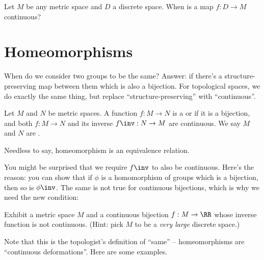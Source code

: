 \begin{ques}
	Let $M$ be any metric space and $D$ a discrete space.
	When is a map $f : D \to M$ continuous?
\end{ques}



\section{Homeomorphisms}
When do we consider two groups to be the same?
Answer: if there's a structure-preserving map between them which is also a bijection.
For topological spaces, we do exactly the same thing, but replace ``structure-preserving'' with ``continuous''.

\begin{definition}
	Let $M$ and $N$ be metric spaces.
	A function $f : M \to N$ is a
	 or  if it is a bijection,
	and both $f : M \to N$ and its inverse $f\inv : N \to M$ are continuous.
	We say $M$ and $N$ are .
\end{definition}
Needless to say, homeomorphism is an equivalence relation.

You might be surprised that we require $f\inv$ to also be continuous.
Here's the reason: you can show that if $\phi$ is a homomorphism of groups
which is a bijection, then so is $\phi\inv$.
The same is not true for continuous bijections, which is why we need the new condition:
\begin{exercise}
	Exhibit a metric space $M$ and a continuous bijection $f : M \to \RR$
	whose inverse function is not continuous.
	(Hint: pick $M$ to be a \emph{very large} discrete space.)
\end{exercise}

Note that this is the topologist's definition of ``same'' --
homeomorphisms are ``continuous deformations''.
Here are some examples.

